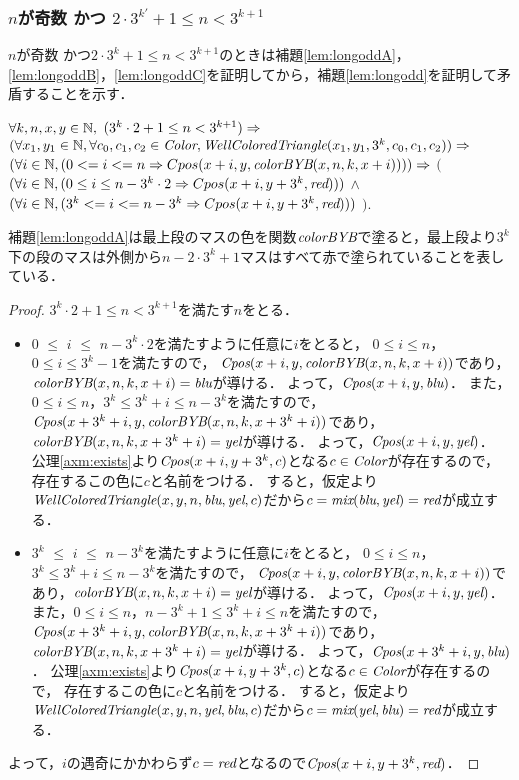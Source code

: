 \subsubsection{$n$が奇数 かつ $2 \cdot 3^{k'} + 1 \leq n < 3^{k+1}$}
$n$が奇数 かつ$2 \cdot 3^{k} + 1 \leq n < 3^{k+1}$のときは補題\ref{lem:longoddA}，\ref{lem:longoddB}，\ref{lem:longoddC}を証明してから，補題\ref{lem:longodd}を証明して矛盾することを示す．
\begin{lem}[\LongOddA] \label{lem:longoddA}
  $\forall k,n,x,y \in \mathbb{N},$
  $(3^k\cdot2 + 1 \leq n < 3^{k+1}) \Rightarrow$
  $(\forall x_1,y_1 \in \mathbb{N}, \forall c_0,c_1,c_2 \in \textit{Color}, \textit{WellColoredTriangle}(x_1,y_1,3^k,c_0,c_1,c_2)) \Rightarrow$
  $(\forall i \in \mathbb{N},(0 <= i <= n \Rightarrow Cpos(x+i,y,\textit{colorBYB}(x,n,k,x+i)))) \Rightarrow$ 
      $($
        $(\forall i \in \mathbb{N},(0 \leq i \leq n - 3^k\cdot2 \Rightarrow Cpos(x+i,y+3^k,\textit{red})))$
        $\land$
        $(\forall i \in \mathbb{N},(3^k <= i <= n - 3^k \Rightarrow Cpos(x+i,y+3^k,\textit{red})))$
      $)$.
\end{lem}
補題\ref{lem:longoddA}は最上段のマスの色を関数$\textit{colorBYB}$で塗ると，最上段より$3^k$下の段のマスは外側から$n-2\cdot3^k+1$マスはすべて赤で塗られていることを表している．
\begin{proof}
  $3^k\cdot2 + 1 \leq n < 3^{k+1}$を満たす$n$をとる．
  \begin{itemize}
  \item
    $0$ $\leq$ $i$ $\leq$ $n - 3^k \cdot 2$を満たすように任意に$i$をとると，
    $0 \leq i \leq n$，$0 \leq i \leq 3^k-1$を満たすので，
    $\textit{Cpos}(x+i,y,\textit{colorBYB}(x,n,k,x+i))$であり，$\textit{colorBYB}(x,n,k,x+i)=\textit{blu}$が導ける．
    よって，$\textit{Cpos}(x+i,y,\textit{blu})$．
    また，$0 \leq i \leq n$，$3^k \leq 3^k+i \leq n-3^k$を満たすので，
    $\textit{Cpos}(x+3^k+i,y,\textit{colorBYB}(x,n,k,x+3^k+i))$であり，$\textit{colorBYB}(x,n,k,x+3^k+i)=\textit{yel}$が導ける．
    よって，$\textit{Cpos}(x+i,y,\textit{yel})$．
    公理\ref{axm:exists}より$\textit{Cpos}(x+i,y+3^k,c)$となる$c\in\textit{Color}$が存在するので，
    存在するこの色に$c$と名前をつける．
    すると，仮定より$\textit{WellColoredTriangle}(x,y,n,\textit{blu},\textit{yel},c)$だから$c=\textit{mix}(\textit{blu},\textit{yel})=\textit{red}$が成立する．
  \item
    $3^k$ $\leq$ $i$ $\leq$ $n - 3^k$を満たすように任意に$i$をとると，
    $0 \leq i \leq n$，$3^k \leq 3^k+i \leq n-3^k$を満たすので，
    $\textit{Cpos}(x+i,y,\textit{colorBYB}(x,n,k,x+i))$であり，$\textit{colorBYB}(x,n,k,x+i)=\textit{yel}$が導ける．
    よって，$\textit{Cpos}(x+i,y,\textit{yel})$．
    また，$0 \leq i \leq n$，$n-3^k+1 \leq 3^k+i \leq n$を満たすので，
    $\textit{Cpos}(x+3^k+i,y,\textit{colorBYB}(x,n,k,x+3^k+i))$であり，$\textit{colorBYB}(x,n,k,x+3^k+i)=\textit{yel}$が導ける．
    よって，$\textit{Cpos}(x+3^k+i,y,\textit{blu})$．
    公理\ref{axm:exists}より$\textit{Cpos}(x+i,y+3^k,c)$となる$c\in\textit{Color}$が存在するので，
    存在するこの色に$c$と名前をつける．
    すると，仮定より$\textit{WellColoredTriangle}(x,y,n,\textit{yel},\textit{blu},c)$だから$c=\textit{mix}(\textit{yel},\textit{blu})=\textit{red}$が成立する．
  \end{itemize}
  よって，$i$の遇奇にかかわらず$c=\textit{red}$となるので$\textit{Cpos}(x+i,y+3^k,\textit{red})$．
\end{proof}


